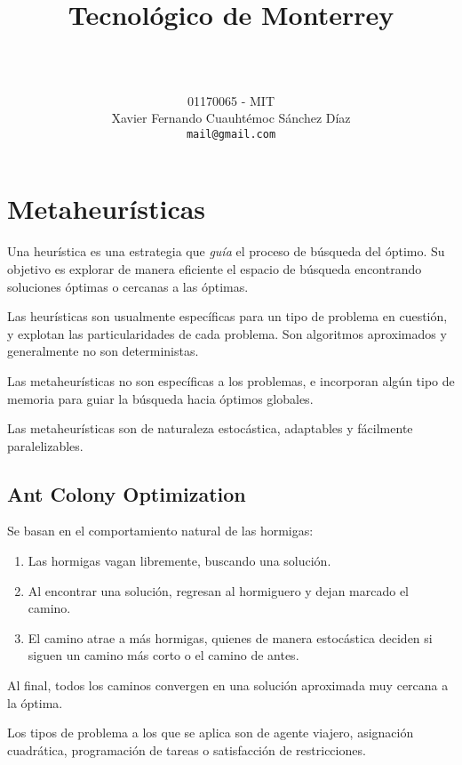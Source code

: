\documentclass[titlepage, letterpaper]{article}
\title{
\vspace{1in}
\textbf{Tecnológico de Monterrey} \\
\vspace{0.5in}
\textmd{\mahclass} \\
\vspace{0.5in}
\textsc{\mahtitle}
\author{01170065  - MIT \\
Xavier Fernando Cuauhtémoc Sánchez Díaz \\
\texttt{mail@gmail.com}}
\date{\mahdate}
}
\begin{document}
\begin{titlepage}
    \maketitle
\end{titlepage}

%
%

\section{Metaheurísticas}

Una heurística es una estrategia que \textit{guía} el proceso de búsqueda del óptimo.
Su objetivo es explorar de manera eficiente el espacio de búsqueda encontrando soluciones óptimas o cercanas a las óptimas.

Las heurísticas son usualmente específicas para un tipo de problema en cuestión, y explotan las particularidades de cada problema.
Son algoritmos aproximados y generalmente no son deterministas.

Las metaheurísticas no son específicas a los problemas,
e incorporan algún tipo de memoria para guiar la búsqueda hacia óptimos globales.

Las metaheurísticas son de naturaleza estocástica, adaptables y fácilmente paralelizables.

\subsection{Ant Colony Optimization} %
\label{sub:ants}

Se basan en el comportamiento natural de las hormigas:
\begin{tcolorbox}
\begin{enumerate}
    \item Las hormigas vagan libremente, buscando una solución.
    \item Al encontrar una solución, regresan al hormiguero y dejan marcado el camino.
    \item El camino atrae a más hormigas, quienes de manera estocástica deciden si siguen un camino más corto o el camino de antes.
\end{enumerate}
Al final, todos los caminos convergen en una solución aproximada muy cercana a la óptima.
\end{tcolorbox}

Los tipos de problema a los que se aplica son de agente viajero, asignación cuadrática, programación de tareas o satisfacción de restricciones.
\end{document}
